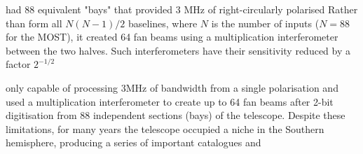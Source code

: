 had 88 equivalent "bays" that provided 3 MHz of right-circularly polarised Rather than form all $N(N-1)/2$ baselines, where $N$ is the number of inputs ($N=88$ for the MOST), it created 64 fan beams using a multiplication interferometer between the two halves. Such interferometers have their sensitivity reduced by a factor $2^{-1/2}$ 

only capable of processing 3MHz of bandwidth from a single polarisation and used a multiplication interferometer to create up to 64 fan beams after 2-bit digitisation from 88 independent sections (bays) of the telescope. Despite these limitations, for many years the telescope occupied a niche in the Southern hemisphere, producing a series of important catalogues and  


